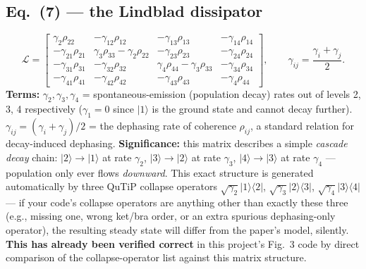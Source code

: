 \documentclass[11pt]{article}
\begin{document}
\subsection*{Eq.~(7) --- the Lindblad dissipator}
\begin{equation}
\mathcal L =
\begin{bmatrix}
\gamma_2\rho_{22} & -\gamma_{12}\rho_{12} & -\gamma_{13}\rho_{13} & -\gamma_{14}\rho_{14}\\
-\gamma_{21}\rho_{21} & \gamma_3\rho_{33}-\gamma_2\rho_{22} & -\gamma_{23}\rho_{23} & -\gamma_{24}\rho_{24}\\
-\gamma_{31}\rho_{31} & -\gamma_{32}\rho_{32} & \gamma_4\rho_{44}-\gamma_3\rho_{33} & -\gamma_{34}\rho_{34}\\
-\gamma_{41}\rho_{41} & -\gamma_{42}\rho_{42} & -\gamma_{43}\rho_{43} & -\gamma_4\rho_{44}
\end{bmatrix},\qquad \gamma_{ij}=\frac{\gamma_i+\gamma_j}{2}. \tag{7}
\end{equation}
\textbf{Terms:} $\gamma_2,\gamma_3,\gamma_4$ = spontaneous-emission
(population decay) rates out of levels 2, 3, 4 respectively ($\gamma_1=0$
since $|1\rangle$ is the ground state and cannot decay further).
$\gamma_{ij}=(\gamma_i+\gamma_j)/2$ = the dephasing rate of coherence
$\rho_{ij}$, a standard relation for decay-induced dephasing.
\textbf{Significance:} this matrix describes a simple \emph{cascade
decay} chain: $|2\rangle\to|1\rangle$ at rate $\gamma_2$,
$|3\rangle\to|2\rangle$ at rate $\gamma_3$, $|4\rangle\to|3\rangle$ at
rate $\gamma_4$ --- population only ever flows \emph{downward}. This
exact structure is generated automatically by three QuTiP collapse
operators $\sqrt{\gamma_2}|1\rangle\langle2|$,
$\sqrt{\gamma_3}|2\rangle\langle3|$, $\sqrt{\gamma_4}|3\rangle\langle4|$
--- if your code's collapse operators are anything other than exactly
these three (e.g., missing one, wrong ket/bra order, or an extra
spurious dephasing-only operator), the resulting steady state will
differ from the paper's model, silently. \textbf{This has already been
verified correct} in this project's Fig.~3 code by direct comparison of
the collapse-operator list against this matrix structure.
\end{document}
